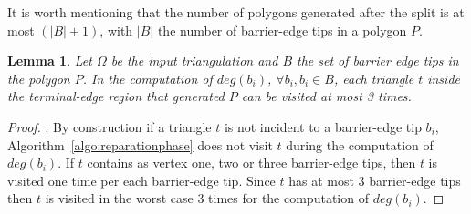\documentclass[lineno,pdflatex,sn-mathphys]{sn-jnl}%
\theoremstyle{thmstyleone}%
\newtheorem{lemma}{Lemma}%
\theoremstyle{thmstyletwo}%
\theoremstyle{thmstylethree}%
\begin{document}
It is worth mentioning that the number of polygons generated after the split is at  most $(\lvert B\rvert + 1)$, with $\lvert B\rvert $ the number of barrier-edge tips in a polygon $P$. 


\begin{lemma} \label{lemma:degReparation}
Let   $\Omega$ be the input triangulation and $B$ the set of barrier edge tips in the polygon $P$. In the computation of $deg(b_i)$,   $\forall b_i, b_i \in B$, each triangle $t$ inside the terminal-edge region that generated $P$ can be visited at most 3 times.
\end{lemma}
\begin{proof}: By construction  
 if a triangle $t$ is not incident to a barrier-edge tip $b_i$, Algorithm~\ref{algo:reparationphase} does not  visit $t$ during the computation of  $deg(b_i)$. If $t$ contains as vertex one, two or three barrier-edge tips, then $t$ is visited one time per each barrier-edge tip. Since $t$ has at most   $3$ barrier-edge tips then $t$ is visited in the worst case $3$ times for the computation of $deg(b_i)$.
\end{proof}


\end{document}
